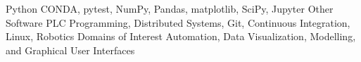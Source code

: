 \begin{cvskills}
    \cvskill
       {Python}
       {CONDA, pytest, NumPy, Pandas, matplotlib, SciPy, Jupyter}
    \cvskill
       {Other Software}
       {PLC Programming, Distributed Systems, Git,
	Continuous Integration, Linux, Robotics}
    \cvskill
       {Domains of Interest}
       {Automation, Data Visualization, Modelling, and Graphical User Interfaces}
\end{cvskills}
